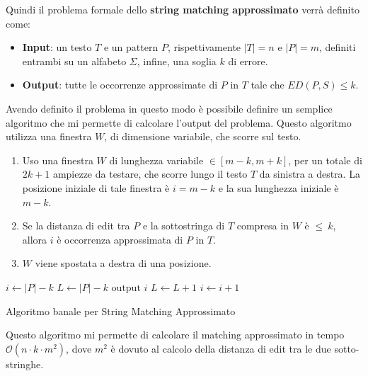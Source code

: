Quindi il problema formale dello \textbf{string matching approssimato} verrà
definito come:
\begin{itemize}
    \item \textbf{Input}: un testo $T$ e un pattern $P$, rispettivamente $|T| = n$
          e $|P| = m$, definiti entrambi su un alfabeto $\Sigma$, infine, una
          soglia $k$ di errore.
    \item \textbf{Output}: tutte le occorrenze approssimate di $P$ in $T$ tale
          che  $ED(P,S)\le k$.
\end{itemize}
Avendo definito il problema in questo modo è possibile definire un semplice
algoritmo che mi permette di calcolare l'output del problema. Questo algoritmo
utilizza una finestra $W$, di dimensione variabile, che scorre sul testo.
\begin{enumerate}
    \item Uso una finestra $W$ di lunghezza variabile $\in [m - k, m + k]$, per
          un totale di $2k+1$ ampiezze da testare, che scorre lungo il testo $T$ da
          sinistra a destra. La posizione iniziale di tale finestra è $i = m - k$ e
          la sua lunghezza iniziale è $m - k$.
    \item Se la distanza di edit tra $P$ e la sottostringa di $T$ compresa in $W$
          è $\leq \ k$, allora $i$ è occorrenza approssimata di $P$ in $T$.
    \item $W$ viene spostata a destra di una posizione.
\end{enumerate}
\begin{algorithm}
    \begin{algorithmic}
        \State $i \gets |P| - k$
        \State $L \gets  |P| - k$
        \State $\text{output } i$
        \EndIf
        \State $L \gets L + 1$
        \EndWhile
        \State $i \gets i + 1$
        \EndWhile
        \EndFunction
    \end{algorithmic}
    \caption{Algoritmo banale per String Matching Approssimato}
\end{algorithm}
Questo algoritmo mi permette di calcolare il matching approssimato in tempo
$\mathcal{O}(n \cdot k \cdot m^2)$, dove $m^2$ è dovuto al calcolo della distanza
di edit tra le due sotto-stringhe.

